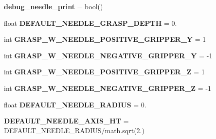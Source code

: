 \begin{DoxyCompactItemize}
\item 
{\bfseries debug\+\_\+needle\+\_\+print} = bool(\textquotesingle{}\textquotesingle{})\hypertarget{namespaceneedle__planner_a3243b71f9583ec0b82469c72ec7760a4}{}\label{namespaceneedle__planner_a3243b71f9583ec0b82469c72ec7760a4}

\item 
float {\bfseries D\+E\+F\+A\+U\+L\+T\+\_\+\+N\+E\+E\+D\+L\+E\+\_\+\+G\+R\+A\+S\+P\+\_\+\+D\+E\+P\+TH} = 0.\hypertarget{namespaceneedle__planner_aca6bc5d6009e84f6c17c7b0d6b8010a7}{}\label{namespaceneedle__planner_aca6bc5d6009e84f6c17c7b0d6b8010a7}

\item 
int {\bfseries G\+R\+A\+S\+P\+\_\+\+W\+\_\+\+N\+E\+E\+D\+L\+E\+\_\+\+P\+O\+S\+I\+T\+I\+V\+E\+\_\+\+G\+R\+I\+P\+P\+E\+R\+\_\+Y} = 1\hypertarget{namespaceneedle__planner_a17619b5de275561bacd693a7d5b13fbc}{}\label{namespaceneedle__planner_a17619b5de275561bacd693a7d5b13fbc}

\item 
int {\bfseries G\+R\+A\+S\+P\+\_\+\+W\+\_\+\+N\+E\+E\+D\+L\+E\+\_\+\+N\+E\+G\+A\+T\+I\+V\+E\+\_\+\+G\+R\+I\+P\+P\+E\+R\+\_\+Y} = -\/1\hypertarget{namespaceneedle__planner_a7d2442473551820bbccb2cd043a43847}{}\label{namespaceneedle__planner_a7d2442473551820bbccb2cd043a43847}

\item 
int {\bfseries G\+R\+A\+S\+P\+\_\+\+W\+\_\+\+N\+E\+E\+D\+L\+E\+\_\+\+P\+O\+S\+I\+T\+I\+V\+E\+\_\+\+G\+R\+I\+P\+P\+E\+R\+\_\+Z} = 1\hypertarget{namespaceneedle__planner_a84d14f7033358fa43a7b3448bb8f69ad}{}\label{namespaceneedle__planner_a84d14f7033358fa43a7b3448bb8f69ad}

\item 
int {\bfseries G\+R\+A\+S\+P\+\_\+\+W\+\_\+\+N\+E\+E\+D\+L\+E\+\_\+\+N\+E\+G\+A\+T\+I\+V\+E\+\_\+\+G\+R\+I\+P\+P\+E\+R\+\_\+Z} = -\/1\hypertarget{namespaceneedle__planner_acb74b9ae367d6edb50740cb76a488a54}{}\label{namespaceneedle__planner_acb74b9ae367d6edb50740cb76a488a54}

\item 
float {\bfseries D\+E\+F\+A\+U\+L\+T\+\_\+\+N\+E\+E\+D\+L\+E\+\_\+\+R\+A\+D\+I\+US} = 0.\hypertarget{namespaceneedle__planner_a4a59f0621cf4cad6a864b08f8c7c14fa}{}\label{namespaceneedle__planner_a4a59f0621cf4cad6a864b08f8c7c14fa}

\item 
{\bfseries D\+E\+F\+A\+U\+L\+T\+\_\+\+N\+E\+E\+D\+L\+E\+\_\+\+A\+X\+I\+S\+\_\+\+HT} = D\+E\+F\+A\+U\+L\+T\+\_\+\+N\+E\+E\+D\+L\+E\+\_\+\+R\+A\+D\+I\+US/math.\+sqrt(2.)\hypertarget{namespaceneedle__planner_a0ef44df8e2d743e699d2b51baf95307c}{}\label{namespaceneedle__planner_a0ef44df8e2d743e699d2b51baf95307c}


\end{DoxyCompactItemize}
